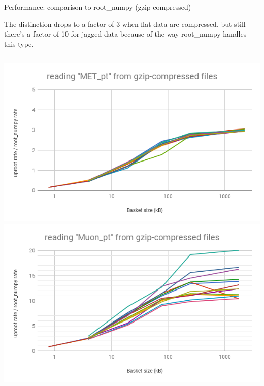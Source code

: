 \documentclass[aspectratio=169]{beamer}
\begin{document}
\begin{frame}{Performance: comparison to root\_numpy (gzip-compressed)}
\vspace{0.5 cm}

The distinction drops to a factor of 3 when flat data are compressed, but still there's a factor of 10 for jagged data because of the way root\_numpy handles this type.

\vspace{0.5 cm}
\begin{columns}
\includegraphics[width=0.5\linewidth]{rootnumpy-gzip-met.png}
\includegraphics[width=0.5\linewidth]{rootnumpy-gzip-muon.png}
\end{columns}
\end{frame}
\end{document}
